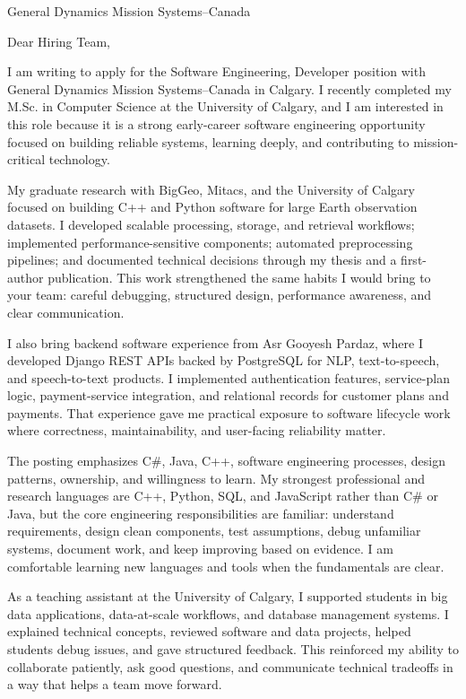 \documentclass[11pt]{letter}
\begin{document}
\begin{letter}{General Dynamics Mission Systems--Canada}

\opening{Dear Hiring Team,}

I am writing to apply for the Software Engineering, Developer position with General Dynamics Mission Systems--Canada in Calgary. I recently completed my M.Sc. in Computer Science at the University of Calgary, and I am interested in this role because it is a strong early-career software engineering opportunity focused on building reliable systems, learning deeply, and contributing to mission-critical technology.

My graduate research with BigGeo, Mitacs, and the University of Calgary focused on building C++ and Python software for large Earth observation datasets. I developed scalable processing, storage, and retrieval workflows; implemented performance-sensitive components; automated preprocessing pipelines; and documented technical decisions through my thesis and a first-author publication. This work strengthened the same habits I would bring to your team: careful debugging, structured design, performance awareness, and clear communication.

I also bring backend software experience from Asr Gooyesh Pardaz, where I developed Django REST APIs backed by PostgreSQL for NLP, text-to-speech, and speech-to-text products. I implemented authentication features, service-plan logic, payment-service integration, and relational records for customer plans and payments. That experience gave me practical exposure to software lifecycle work where correctness, maintainability, and user-facing reliability matter.

The posting emphasizes C\#, Java, C++, software engineering processes, design patterns, ownership, and willingness to learn. My strongest professional and research languages are C++, Python, SQL, and JavaScript rather than C\# or Java, but the core engineering responsibilities are familiar: understand requirements, design clean components, test assumptions, debug unfamiliar systems, document work, and keep improving based on evidence. I am comfortable learning new languages and tools when the fundamentals are clear.

As a teaching assistant at the University of Calgary, I supported students in big data applications, data-at-scale workflows, and database management systems. I explained technical concepts, reviewed software and data projects, helped students debug issues, and gave structured feedback. This reinforced my ability to collaborate patiently, ask good questions, and communicate technical tradeoffs in a way that helps a team move forward.


\end{letter}
\end{document}
